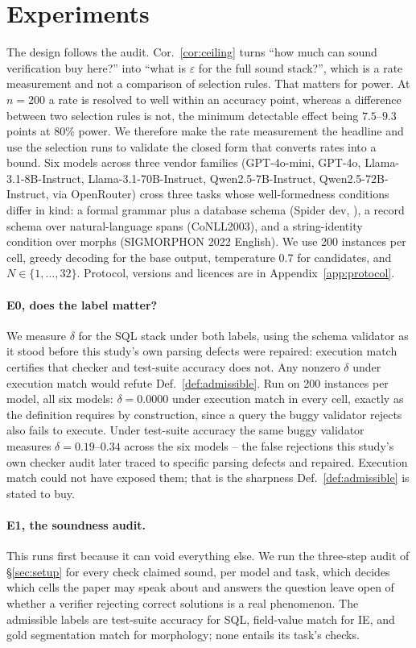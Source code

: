 \documentclass[11pt]{article}
\begin{document}
\section{Experiments}\label{sec:exp}
The design follows the audit. Cor.~\ref{cor:ceiling} turns ``how much can sound
verification buy here?'' into ``what is $\varepsilon$ for the full sound
stack?'', which is a rate measurement and not a comparison of selection rules.
That matters for power. At $n=200$ a rate is resolved to well within an accuracy
point, whereas a difference between two selection rules is not, the minimum
detectable effect being $7.5$--$9.3$ points at 80\% power. We therefore make the
rate measurement the headline and use the selection runs to validate the closed
form that converts rates into a bound. Six models across three vendor
families (GPT-4o-mini, GPT-4o, Llama-3.1-8B-Instruct, Llama-3.1-70B-Instruct,
Qwen2.5-7B-Instruct, Qwen2.5-72B-Instruct, via OpenRouter) cross three tasks
whose well-formedness conditions differ in kind: a formal grammar plus a database
schema (Spider dev, \citealp{yu2018spider}), a record schema over
natural-language spans (CoNLL2003), and a string-identity condition over morphs
(SIGMORPHON 2022 English). We use 200 instances per cell, greedy decoding for the
base output, temperature 0.7 for candidates, and $N\in\{1,\dots,32\}$. Protocol,
versions and licences are in Appendix~\ref{app:protocol}.

\paragraph{E0, does the label matter?} We measure $\delta$ for the SQL stack
under both labels, using the schema validator as it stood before this study's
own parsing defects were repaired: execution match certifies that checker and
test-suite accuracy does not. Any nonzero $\delta$ under execution match would
refute Def.~\ref{def:admissible}. Run on 200 instances per model, all six
models: $\delta=0.0000$ under execution match in every cell, exactly as the
definition requires by construction, since a query the buggy validator rejects
also fails to execute. Under test-suite accuracy the same buggy validator
measures $\delta=0.19$--$0.34$ across the six models -- the false rejections
this study's own checker audit later traced to specific parsing defects and
repaired. Execution match could not have exposed them; that is the sharpness
Def.~\ref{def:admissible} is stated to buy.

\paragraph{E1, the soundness audit.} This runs first because it can void
everything else. We run the three-step audit of \S\ref{sec:setup} for every check
claimed sound, per model and task, which decides which cells the paper may speak
about and answers the question \citet{stroebl2024verifier} leave open of whether
a verifier rejecting correct solutions is a real phenomenon. The admissible
labels are test-suite accuracy \citep{zhong2020testsuite} for SQL, field-value
match for IE, and gold segmentation match for morphology; none entails its
task's checks.
\end{document}
